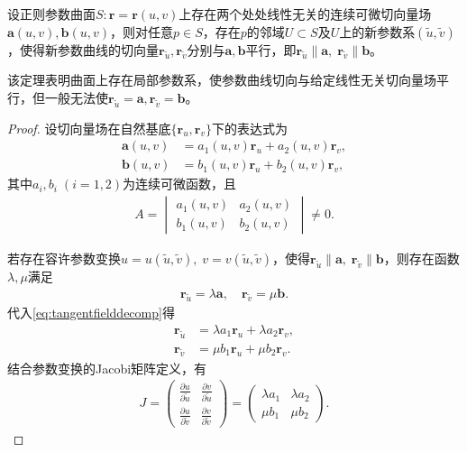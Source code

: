 \documentclass[../../main.tex]{subfiles}%
\begin{document}
\begin{theorem}
设正则参数曲面$S:\bm r=\bm r(u,v)$上存在两个处处线性无关的连续可微切向量场$\bm a(u,v),\bm b(u,v)$，则对任意$p\in S$，存在$p$的邻域$U\subset S$及$U$上的新参数系$(\tilde u,\tilde v)$，使得新参数曲线的切向量$\bm r_{\tilde u},\bm r_{\tilde v}$分别与$\bm a,\bm b$平行，即$\bm r_{\tilde u}\parallel\bm a,\;\bm r_{\tilde v}\parallel\bm b$。
\end{theorem}
\begin{remark}
该定理表明曲面上存在局部参数系，使参数曲线切向与给定线性无关切向量场平行，但一般无法使$\bm r_{\tilde u}=\bm a,\bm r_{\tilde v}=\bm b$。
\end{remark}
\begin{proof}
设切向量场在自然基底$\{\bm r_u,\bm r_v\}$下的表达式为
\begin{align}
\bm a(u,v) &= a_1(u,v)\bm r_u + a_2(u,v)\bm r_v,\nonumber\\
\bm b(u,v) &= b_1(u,v)\bm r_u + b_2(u,v)\bm r_v,
\label{eq:tangentfielddecomp}
\end{align}
其中$a_i,b_i\;(i=1,2)$为连续可微函数，且
\begin{align}
A=\begin{vmatrix}a_1(u,v)&a_2(u,v)\\b_1(u,v)&b_2(u,v)\end{vmatrix}\neq0.
\label{eq:detnonzero}
\end{align}

若存在容许参数变换$u=u(\tilde u,\tilde v),\;v=v(\tilde u,\tilde v)$，使得$\bm r_{\tilde u}\parallel\bm a,\;\bm r_{\tilde v}\parallel\bm b$，则存在函数$\lambda,\mu$满足
\begin{align}
\bm r_{\tilde u}=\lambda\bm a,\quad \bm r_{\tilde v}=\mu\bm b.
\label{eq:paralleltangentvec}
\end{align}
代入\eqref{eq:tangentfielddecomp}得
\begin{align*}
\bm r_{\tilde u}&=\lambda a_1\bm r_u+\lambda a_2\bm r_v,\\
\bm r_{\tilde v}&=\mu b_1\bm r_u+\mu b_2\bm r_v.
\end{align*}
结合参数变换的Jacobi矩阵定义，有
\begin{align}
J=\begin{pmatrix}
\frac{\partial u}{\partial\tilde u}&\frac{\partial v}{\partial\tilde u}\\
\frac{\partial u}{\partial\tilde v}&\frac{\partial v}{\partial\tilde v}
\end{pmatrix}
=\begin{pmatrix}
\lambda a_1&\lambda a_2\\
\mu b_1&\mu b_2
\end{pmatrix}.
\label{eq:jacobiorig}
\end{align}


\end{proof}
\end{document}
